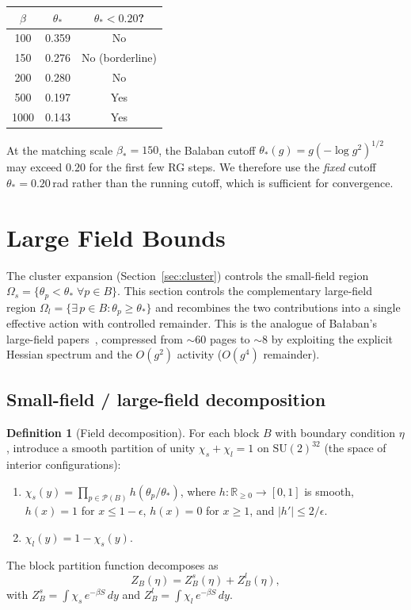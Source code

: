\documentclass[11pt]{article}
\theoremstyle{definition}
\newtheorem{definition}[theorem]{Definition}
\newcommand{\SU}{\mathrm{SU}}
\newcommand{\R}{\mathbb{R}}
\begin{document}
\begin{center}
\begin{tabular}{ccc}
\toprule
$\beta$ & $\theta_*$ & $\theta_*<0.20$?\\
\midrule
100 & 0.359 & No\\
150 & 0.276 & No (borderline)\\
200 & 0.280 & No\\
500 & 0.197 & Yes\\
1000 & 0.143 & Yes\\
\bottomrule
\end{tabular}
\end{center}
At the matching scale $\beta_*=150$, the Balaban cutoff
$\theta_*(g)=g(-\log g^2)^{1/2}$ may exceed $0.20$ for the first few
RG steps.  We therefore use the \emph{fixed} cutoff
$\theta_*=0.20$\,rad rather than the running cutoff, which is
sufficient for convergence.

\section{Large Field Bounds}\label{sec:largefield}

The cluster expansion (Section~\ref{sec:cluster}) controls the small-field
region $\Omega_s=\{\theta_p<\theta_*\;\forall p\in B\}$.  This section
controls the complementary large-field region
$\Omega_l=\{\exists\,p\in B:\theta_p\ge\theta_*\}$ and recombines the
two contributions into a single effective action with controlled remainder.
This is the analogue of Ba\l aban's large-field papers~\cite{BalabanLF1,BalabanLF2},
compressed from ${\sim}60$ pages to ${\sim}8$ by exploiting the explicit
Hessian spectrum and the $O(g^2)$ activity ($O(g^4)$ remainder).

\subsection{Small-field / large-field decomposition}

\begin{definition}[Field decomposition]\label{def:decomp}
For each block $B$ with boundary condition $\eta$, introduce a smooth
partition of unity $\chi_s+\chi_l=1$ on $\SU(2)^{32}$ (the space of
interior configurations):
\begin{enumerate}[nosep,label=(\roman*)]
\item $\chi_s(y)=\prod_{p\in\mathcal{P}(B)}h(\theta_p/\theta_*)$,
where $h:\R_{\ge 0}\to[0,1]$ is smooth, $h(x)=1$ for $x\le 1-\epsilon$,
$h(x)=0$ for $x\ge 1$, and $|h'|\le 2/\epsilon$.
\item $\chi_l(y)=1-\chi_s(y)$.
\end{enumerate}
The block partition function decomposes as
\begin{equation}\label{eq:Z-decomp}
Z_B(\eta)=Z_B^s(\eta)+Z_B^l(\eta),
\end{equation}
with $Z_B^s=\int\chi_s\,e^{-\beta S}\,dy$ and
$Z_B^l=\int\chi_l\,e^{-\beta S}\,dy$.
\end{definition}
\end{document}
